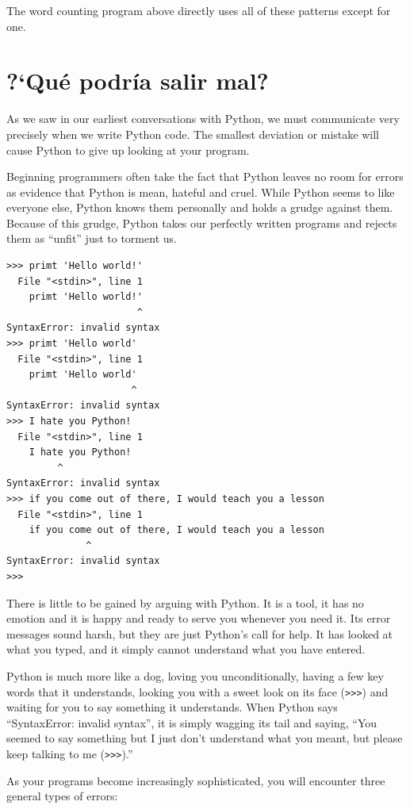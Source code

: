 The word counting program above directly uses all of 
these patterns except for one.

\section{?`Qu\'e podr\'ia salir mal?}

As we saw in our earliest conversations with Python, we must
communicate very precisely when we write Python code.  The smallest
deviation or mistake will cause Python to give up looking at your
program.

Beginning programmers often take the fact that Python leaves no
room for errors as evidence that Python is mean, hateful and cruel.
While Python seems to like everyone else, Python knows them 
personally and holds a grudge against them.  Because of this grudge,
Python takes our perfectly written programs and rejects them as 
``unfit'' just to torment us.

\beforeverb
\begin{verbatim}
>>> primt 'Hello world!'
  File "<stdin>", line 1
    primt 'Hello world!'
                       ^
SyntaxError: invalid syntax
>>> primt 'Hello world'
  File "<stdin>", line 1
    primt 'Hello world'
                      ^
SyntaxError: invalid syntax
>>> I hate you Python!
  File "<stdin>", line 1
    I hate you Python!
         ^
SyntaxError: invalid syntax
>>> if you come out of there, I would teach you a lesson
  File "<stdin>", line 1
    if you come out of there, I would teach you a lesson
              ^
SyntaxError: invalid syntax
>>> 
\end{verbatim}
\afterverb
%
There is little to be gained by arguing with Python.  It is a tool,
it has no emotion and it is happy and ready to serve you whenever you
need it.  Its error messages sound harsh, but they are just Python's
call for help.  It has looked at what you typed, and it simply cannot
understand what you have entered.

Python is much more like a dog, loving you unconditionally, having a few
key words that it understands, looking you with a sweet look on its
face ({\tt >>>}) and waiting for you to say something it understands.
When Python says ``SyntaxError: invalid syntax'', it is simply wagging
its tail and saying, ``You seemed to say something but I just don't
understand what you meant, but please keep talking to me ({\tt >>>}).''

As your programs become increasingly sophisticated, you will encounter three 
general types of errors:

